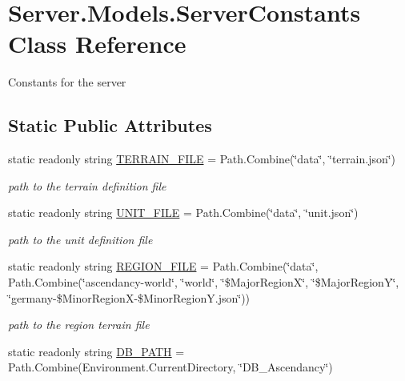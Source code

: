 \hypertarget{classServer_1_1Models_1_1ServerConstants}{}\section{Server.\+Models.\+Server\+Constants Class Reference}
\label{classServer_1_1Models_1_1ServerConstants}


Constants for the server  


\subsection*{Static Public Attributes}
\begin{DoxyCompactItemize}
\item 
static readonly string \hyperlink{classServer_1_1Models_1_1ServerConstants_a7f75857909d69ae4f0383bd056bb7ece}{T\+E\+R\+R\+A\+I\+N\+\_\+\+F\+I\+L\+E} = Path.\+Combine(\char`\"{}data\char`\"{}, \char`\"{}terrain.\+json\char`\"{})
\begin{DoxyCompactList}\small\item\em path to the terrain definition file \end{DoxyCompactList}\item 
static readonly string \hyperlink{classServer_1_1Models_1_1ServerConstants_ab3ffa60d4d7a6a7ca066f99e815b9471}{U\+N\+I\+T\+\_\+\+F\+I\+L\+E} = Path.\+Combine(\char`\"{}data\char`\"{}, \char`\"{}unit.\+json\char`\"{})
\begin{DoxyCompactList}\small\item\em path to the unit definition file \end{DoxyCompactList}\item 
static readonly string \hyperlink{classServer_1_1Models_1_1ServerConstants_a5d1875e241daeed9ec89b7ab3c49d3ec}{R\+E\+G\+I\+O\+N\+\_\+\+F\+I\+L\+E} = Path.\+Combine(\char`\"{}data\char`\"{}, Path.\+Combine(\char`\"{}ascendancy-\/world\char`\"{}, \char`\"{}world\char`\"{}, \char`\"{}\$Major\+Region\+X\char`\"{}, \char`\"{}\$Major\+Region\+Y\char`\"{}, \char`\"{}germany-\/\$Minor\+Region\+X-\/\$Minor\+Region\+Y.\+json\char`\"{}))
\begin{DoxyCompactList}\small\item\em path to the region terrain file \end{DoxyCompactList}\item 
static readonly string \hyperlink{classServer_1_1Models_1_1ServerConstants_aed13f8301da1cc1f8e0bc6c7a8936807}{D\+B\+\_\+\+P\+A\+T\+H} = Path.\+Combine(Environment.\+Current\+Directory, \char`\"{}D\+B\+\_\+\+Ascendancy\char`\"{})

\end{DoxyCompactItemize}
